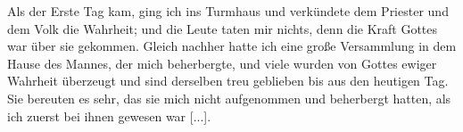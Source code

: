 Als der Erste Tag kam, ging ich ins Turmhaus
und verkündete dem Priester und dem Volk die 
Wahrheit; und
die Leute taten mir nichts, denn die Kraft Gottes war über sie
gekommen. Gleich nachher hatte ich eine große Versammlung in
dem Hause des Mannes, der mich beherbergte, und viele wurden
von Gottes ewiger Wahrheit überzeugt und sind derselben treu
geblieben bis aus den heutigen Tag. Sie bereuten es sehr, das
sie mich nicht aufgenommen und beherbergt hatten, als ich zuerst
bei ihnen gewesen war [...].

